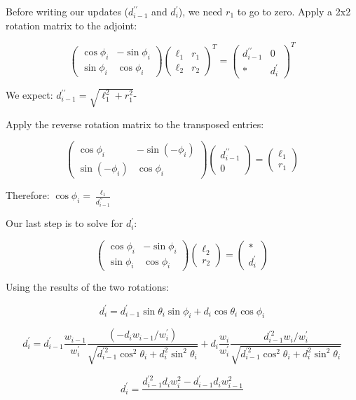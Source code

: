 \documentclass{article}
\begin{document}
Before writing our updates ($d_{i-1}^{\prime\prime}$ and $d_i^\prime$), we need $r_1$ to go to zero. Apply a 2x2 rotation matrix to the adjoint:

$$
\left(\begin{matrix}
	\cos \phi_i & -\sin\phi_i \\
	\sin\phi_i & \cos\phi_i
\end{matrix}
\right)
\left(\begin{matrix}
	\ell_1 & r_1 \\ \ell_2 & r_2
\end{matrix}\right)^T
=
\left(\begin{matrix}
	d_{i-1}^{\prime\prime}
	&
	0
	\\
	* & d_i^\prime
\end{matrix}\right)^T
$$

We expect: $d_{i-1}^{\prime\prime} = \sqrt{\ell_1^2 + r_1^2}$-

Apply the reverse rotation matrix to the transposed entries:

$$
\left(\begin{matrix}
	\cos \phi_i & -\sin(-\phi_i) \\
	\sin(-\phi_i) & \cos\phi_i
\end{matrix}
\right)
\left(\begin{matrix} d_{i-1}^{\prime\prime
	}
\\ 0 \end{matrix}\right)
=
\left(\begin{matrix}
	\ell_1 \\ r_1 \end{matrix}\right)
$$

Therefore: $\cos\phi_i = \frac{\ell_1}{d_{i-1}^{\prime\prime}}$

Our last step is to solve for $d_i^\prime$:

$$
\left(\begin{matrix}
	\cos \phi_i & -\sin\phi_i \\
	\sin\phi_i & \cos\phi_i
\end{matrix}
\right)
\left( \begin{matrix} \ell_2 \\ r_2 \end{matrix}\right)
=
\left( \begin{matrix} * \\ d_i^\prime \end{matrix} \right)
$$

Using the results of the two rotations:

$$
d_i^\prime =
d_{i-1}^\prime \sin\theta_i \sin\phi_i + d_i \cos\theta_i \cos\phi_i
$$

$$
d_i^\prime
=
d_{i-1}^\prime
\frac{w_{i-1}}{w_i^\prime}
\frac{(-d_i w_{i-1}/w_{i}^{\prime})}{\sqrt{
		d_{i-1}^{\prime2} \cos^2 \theta_i
		+ d_i^2 \sin^2 \theta_i
	}}
+
d_i
\frac{w_i}{w_i^\prime}
\frac{d_{i-1}^{\prime2} w_i/w_i^\prime}{\sqrt{
		d_{i-1}^{\prime2} \cos^2 \theta_i
		+ d_i^2 \sin^2 \theta_i
}}
$$

$$
d_i^\prime
=
\frac{
	d_{i-1}^{\prime2} d_i w_i^2 - d_{i-1}^\prime d_i w_{i-1}^2
}{}
$$
\end{document}
